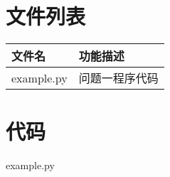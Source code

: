 \documentclass{cumcmthesis}
\begin{document}


\newpage
\begin{appendices}
\section{文件列表}
\begin{table}[H]
\centering
\begin{tabularx}{\textwidth}{LL}
\toprule
文件名   & 功能描述 \\
\midrule
example.py & 问题一程序代码 \\
\bottomrule
\end{tabularx}
\label{tab:文件列表}
\end{table}

\section{代码}
\noindent example.py

\end{appendices}
\end{document}
